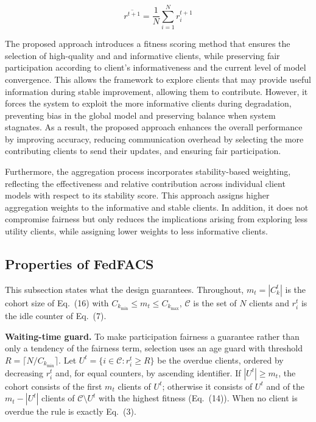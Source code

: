 \documentclass[pdflatex,sn-mathphys-num,oneside]{sn-jnl}%
\theoremstyle{thmstyleone}%
\theoremstyle{thmstyletwo}%
\theoremstyle{thmstylethree}%
\begin{document}
\begin{equation}
\overline{r^{t+1}} = \frac{1}{N} \sum_{i=1}^{N} r_i^{t+1}
\label{eq:avg_idle_correct}
\end{equation}

The proposed approach introduces a fitness scoring method that ensures the selection of high-quality and and informative clients, while preserving fair participation according to client’s informativeness and the current level of model convergence. This allows the framework to explore clients that may provide useful information during stable improvement, allowing them to contribute. However, it forces the system to exploit the more informative clients during degradation, preventing bias in the global model and preserving balance when system stagnates. As a result, the proposed approach enhances the overall performance by improving accuracy, reducing communication overhead by selecting the more contributing clients to send their updates, and ensuring fair participation. 

Furthermore, the aggregation process incorporates stability-based weighting, reflecting the effectiveness and relative contribution across individual client models with respect to its stability score. This approach assigns higher aggregation weights to the informative and stable clients. In addition, it does not compromise fairness but only reduces the implications arising from exploring less utility clients, while assigning lower weights to less informative clients.

\subsection{Properties of FedFACS}\label{sec:properties}
This subsection states what the design guarantees. Throughout, $m_t=|C_k^t|$ is the cohort size of Eq.~(16) with $C_{k_{\min}}\le m_t\le C_{k_{\max}}$, $\mathcal{C}$ is the set of $N$ clients and $r_i^t$ is the idle counter of Eq.~(7).

\textbf{Waiting-time guard.} To make participation fairness a guarantee rather than only a tendency of the fairness term, selection uses an age guard with threshold $R=\lceil N/C_{k_{\min}}\rceil$. Let $U^t=\{i\in\mathcal{C}: r_i^t\ge R\}$ be the overdue clients, ordered by decreasing $r_i^t$ and, for equal counters, by ascending identifier. If $|U^t|\ge m_t$, the cohort consists of the first $m_t$ clients of $U^t$; otherwise it consists of $U^t$ and of the $m_t-|U^t|$ clients of $\mathcal{C}\setminus U^t$ with the highest fitness (Eq.~(14)). When no client is overdue the rule is exactly Eq.~(3).
\end{document}
